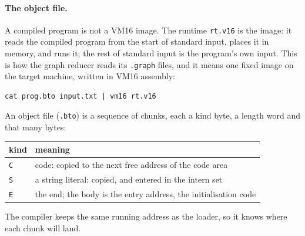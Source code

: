 \documentclass[11pt,a4paper]{article}
\newcommand{\vm}{VM16}
\begin{document}
\paragraph{The object file.} A compiled program is not a \vm{} image. The
runtime \texttt{rt.v16} is the image: it reads the compiled program from the
start of standard input, places it in memory, and runs it; the rest of
standard input is the program's own input. This is how the graph reducer
reads its \texttt{.graph} files, and it means one fixed image on the target
machine, written in \vm{} assembly:
\begin{lstlisting}[style=shell]
cat prog.bto input.txt | vm16 rt.v16
\end{lstlisting}
An object file (\texttt{.bto}) is a sequence of chunks, each a kind byte, a
length word and that many bytes:
\begin{center}
\small
\begin{tabular}{@{}l l@{}}
\toprule
kind & meaning\\
\midrule
\texttt{C} & code: copied to the next free address of the code area\\
\texttt{S} & a string literal: copied, and entered in the intern set\\
\texttt{E} & the end; the body is the entry address, the initialisation code\\
\bottomrule
\end{tabular}
\end{center}
The compiler keeps the same running address as the loader, so it knows
where each chunk will land.
\end{document}
